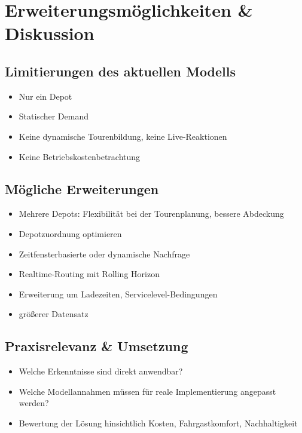 \chapter{Erweiterungsmöglichkeiten \& Diskussion}
\section{Limitierungen des aktuellen Modells}
\begin{itemize}
    \item Nur ein Depot
    \item Statischer Demand
    \item Keine dynamische Tourenbildung, keine Live-Reaktionen
    \item Keine Betriebskostenbetrachtung
\end{itemize}

\section{Mögliche Erweiterungen}
\begin{itemize}
    \item Mehrere Depots: Flexibilität bei der Tourenplanung, bessere Abdeckung
    \item Depotzuordnung optimieren
    \item Zeitfensterbasierte oder dynamische Nachfrage
    \item Realtime-Routing mit Rolling Horizon
    \item Erweiterung um Ladezeiten, Servicelevel-Bedingungen
    \item größerer Datensatz
\end{itemize}


\section{Praxisrelevanz \& Umsetzung}
\begin{itemize}
    \item Welche Erkenntnisse sind direkt anwendbar?
    \item Welche Modellannahmen müssen für reale Implementierung angepasst werden?
    \item Bewertung der Lösung hinsichtlich Kosten, Fahrgastkomfort, Nachhaltigkeit
\end{itemize}
